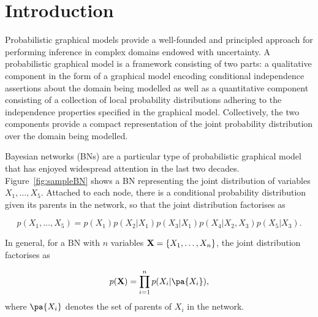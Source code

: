 \section{Introduction}



Probabilistic graphical models provide a well-founded and principled approach for performing inference 
in complex domains endowed with uncertainty. A probabilistic graphical model is a framework consisting 
of two parts: a qualitative component in the form of a graphical model encoding conditional independence 
assertions about the domain being modelled as well as a quantitative component consisting of a collection of local 
probability distributions adhering to the independence properties specified in the graphical model. Collectively, the 
two components provide a compact representation of the joint probability distribution over the domain being modelled. 

Bayesian networks (BNs) \cite{Pearl88} are a particular type of
probabilistic graphical model that has enjoyed widespread attention in
the last two decades. Figure~\ref{fig:sampleBN} shows a BN representing
the joint distribution of variables $X_1,\ldots,X_5$. Attached to each node, there is a conditional probability
distribution given its parents in the network, so that the joint distribution factorises as

\[
p(X_1,\ldots,X_5) = p(X_1) p(X_2|X_1) p(X_3|X_1) p(X_4|X_2,X_3) p(X_5|X_3).
\]

In general, for a BN with $n$ variables $\bX=\{X_1,\ldots,X_n\}$, the joint distribution factorises as

\begin{equation}
\label{equ:factorisation}
p(\bX) = \prod_{i=1}^n p(X_i|\pa{X_i}) ,
\end{equation}
where $\pa{X_i}$ denotes the set of parents of $X_i$ in the network. 


\newcommand{\simpleModel}{    
      \node[obs] (X1) {$X_1$};
      \node[obs] (X2) [below left of=X1, xshift=-1.2cm, yshift=-1.2cm] {$X_2$};
      \node[obs] (X3) [below right of=X1, xshift=+1.2cm, yshift=-1.2cm] {$X_3$};
      \node[obs] (X4) [below right of=X2, xshift=+1.2cm, yshift=-1.2cm] {$X_4$};
      \node[obs] (X5) [below right of=X3, xshift=+1.2cm, yshift=-1.2cm] {$X_5$};
      \edge{X1}{X2};
      \edge{X1}{X3};
      \edge{X2,X3}{X4};
      \edge{X3}{X5};
    }
    
